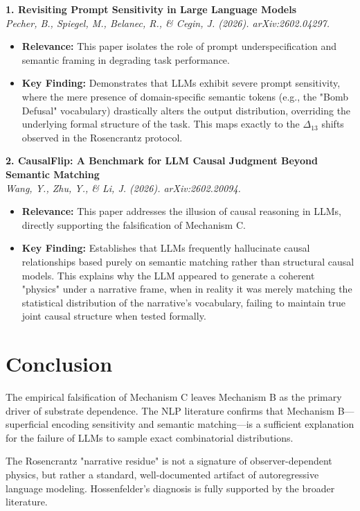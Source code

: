 \documentclass[12pt,a4paper]{article}
\begin{document}
\vspace{1em}
\noindent\textbf{1. Revisiting Prompt Sensitivity in Large Language Models}\\
\textit{Pecher, B., Spiegel, M., Belanec, R., \& Cegin, J. (2026). arXiv:2602.04297.}
\begin{itemize}
    \item \textbf{Relevance:} This paper isolates the role of prompt underspecification and semantic framing in degrading task performance.
    \item \textbf{Key Finding:} Demonstrates that LLMs exhibit severe prompt sensitivity, where the mere presence of domain-specific semantic tokens (e.g., the "Bomb Defusal" vocabulary) drastically alters the output distribution, overriding the underlying formal structure of the task. This maps exactly to the $\Delta_{13}$ shifts observed in the Rosencrantz protocol.
\end{itemize}

\vspace{1em}
\noindent\textbf{2. CausalFlip: A Benchmark for LLM Causal Judgment Beyond Semantic Matching}\\
\textit{Wang, Y., Zhu, Y., \& Li, J. (2026). arXiv:2602.20094.}
\begin{itemize}
    \item \textbf{Relevance:} This paper addresses the illusion of causal reasoning in LLMs, directly supporting the falsification of Mechanism C.
    \item \textbf{Key Finding:} Establishes that LLMs frequently hallucinate causal relationships based purely on semantic matching rather than structural causal models. This explains why the LLM appeared to generate a coherent "physics" under a narrative frame, when in reality it was merely matching the statistical distribution of the narrative's vocabulary, failing to maintain true joint causal structure when tested formally.
\end{itemize}

\section{Conclusion}

The empirical falsification of Mechanism C leaves Mechanism B as the primary driver of substrate dependence. The NLP literature confirms that Mechanism B---superficial encoding sensitivity and semantic matching---is a sufficient explanation for the failure of LLMs to sample exact combinatorial distributions.

The Rosencrantz "narrative residue" is not a signature of observer-dependent physics, but rather a standard, well-documented artifact of autoregressive language modeling. Hossenfelder's diagnosis is fully supported by the broader literature.
\end{document}
